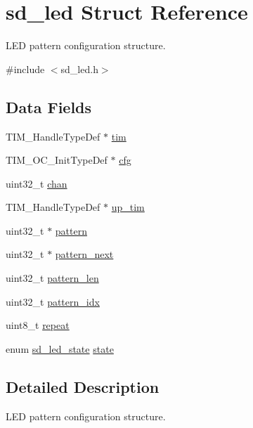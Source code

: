 \hypertarget{structsd__led}{}\section{sd\+\_\+led Struct Reference}
\label{structsd__led}


L\+ED pattern configuration structure.  




{\ttfamily \#include $<$sd\+\_\+led.\+h$>$}

\subsection*{Data Fields}
\begin{DoxyCompactItemize}
\item 
T\+I\+M\+\_\+\+Handle\+Type\+Def $\ast$ \mbox{\hyperlink{structsd__led_a6e46bfc6fae939f8fc5ee53ea4551f18}{tim}}
\item 
T\+I\+M\+\_\+\+O\+C\+\_\+\+Init\+Type\+Def $\ast$ \mbox{\hyperlink{structsd__led_acaf3272a1f93d49be9ec4c31804252e6}{cfg}}
\item 
uint32\+\_\+t \mbox{\hyperlink{structsd__led_afb67f3e4e204785118073a96b76614d6}{chan}}
\item 
T\+I\+M\+\_\+\+Handle\+Type\+Def $\ast$ \mbox{\hyperlink{structsd__led_a61d4acd84796eefb3b7dead0fae9dabb}{up\+\_\+tim}}
\item 
uint32\+\_\+t $\ast$ \mbox{\hyperlink{structsd__led_a70c2ff7a80dc607b1f146e4aa1494c43}{pattern}}
\item 
uint32\+\_\+t $\ast$ \mbox{\hyperlink{structsd__led_aa3c569d89c64771860f259ee403b8f6a}{pattern\+\_\+next}}
\item 
uint32\+\_\+t \mbox{\hyperlink{structsd__led_ad68a2de2731d9bf342369de2cdc270c5}{pattern\+\_\+len}}
\item 
uint32\+\_\+t \mbox{\hyperlink{structsd__led_a60a9dc074fe55a93fc9752d68bef8673}{pattern\+\_\+idx}}
\item 
uint8\+\_\+t \mbox{\hyperlink{structsd__led_a29642221aad4146341708fe32dfb8064}{repeat}}
\item 
enum \mbox{\hyperlink{group___s_d___l_e_d___types_ga7daede63a3984f10471c8eb658e936e3}{sd\+\_\+led\+\_\+state}} \mbox{\hyperlink{structsd__led_ac9669ff49203650ec3bb05c456a4e10a}{state}}
\end{DoxyCompactItemize}


\subsection{Detailed Description}
L\+ED pattern configuration structure. 

